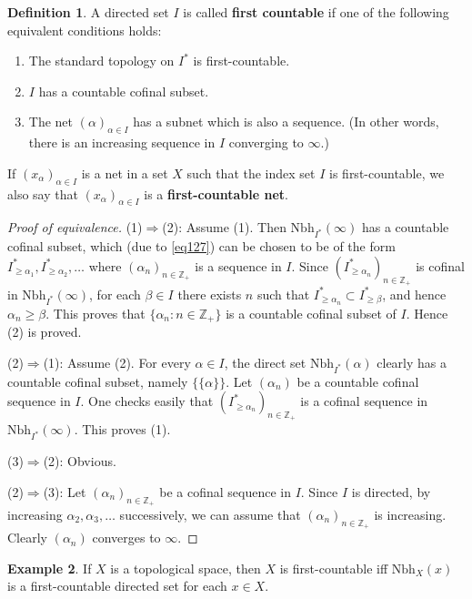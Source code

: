 \documentclass[12pt,b5paper,notitlepage]{article}
\theoremstyle{definition}
\newtheorem{df}{Definition}[subsection]
\newtheorem{eg}[df]{Example}
\theoremstyle{plain}
\newcommand{\Zbb}{\mathbb Z}
\newcommand{\Nbh}{\mathrm{Nbh}}
\numberwithin{equation}{section}
\begin{document}
\begin{df}\label{lb492}
A directed set $I$ is called \textbf{first countable}  if one of the following equivalent conditions holds:
\begin{enumerate}[label=(\arabic*)]
\item The standard topology on $I^*$ is first-countable.
\item $I$ has a countable cofinal subset.
\item The net $(\alpha)_{\alpha\in I}$ has a subnet which is also a sequence. (In other words, there is an increasing sequence in $I$ converging to $\infty$.) 
\end{enumerate} 
If $(x_\alpha)_{\alpha\in I}$ is a net in a set $X$ such that the index set $I$ is first-countable, we also say that $(x_\alpha)_{\alpha\in I}$ is a \textbf{first-countable net}. 
\end{df}

\begin{proof}[Proof of equivalence]
(1)$\Rightarrow$(2): Assume (1). Then $\Nbh_{I^*}(\infty)$ has a countable cofinal subset, which (due to \eqref{eq127}) can be chosen to be of the form $I_{\geq\alpha_1}^*,I_{\geq\alpha_2}^*,\dots$ where $(\alpha_n)_{n\in\Zbb_+}$ is a sequence in $I$. Since $(I_{\geq\alpha_n}^*)_{n\in\Zbb_+}$ is cofinal in $\Nbh_{I^*}(\infty)$, for each $\beta\in I$ there exists $n$ such that $I_{\geq\alpha_n}^*\subset I_{\geq\beta}^*$, and hence $\alpha_n\geq\beta$. This proves that $\{\alpha_n:n\in\Zbb_+\}$ is a countable cofinal subset of $I$. Hence (2) is proved.

(2)$\Rightarrow$(1): Assume (2). For every $\alpha\in I$, the direct set $\Nbh_{I^*}(\alpha)$ clearly has a countable cofinal subset, namely $\{\{\alpha\}\}$. Let $(\alpha_n)$ be a countable cofinal sequence in $I$. One checks easily that $(I_{\geq\alpha_n}^*)_{n\in\Zbb_+}$ is a cofinal sequence in $\Nbh_{I^*}(\infty)$. This proves (1).

(3)$\Rightarrow$(2): Obvious.

(2)$\Rightarrow$(3): Let $(\alpha_n)_{n\in\Zbb_+}$ be a cofinal sequence in $I$. Since $I$ is directed, by increasing $\alpha_2,\alpha_3,\dots$ successively, we can assume that $(\alpha_n)_{n\in\Zbb_+}$ is increasing. Clearly $(\alpha_n)$ converges to $\infty$.
\end{proof}



\begin{eg}
If $X$ is a topological space, then $X$ is first-countable iff $\Nbh_X(x)$ is a first-countable directed set for each $x\in X$.
\end{eg}
\end{document}

